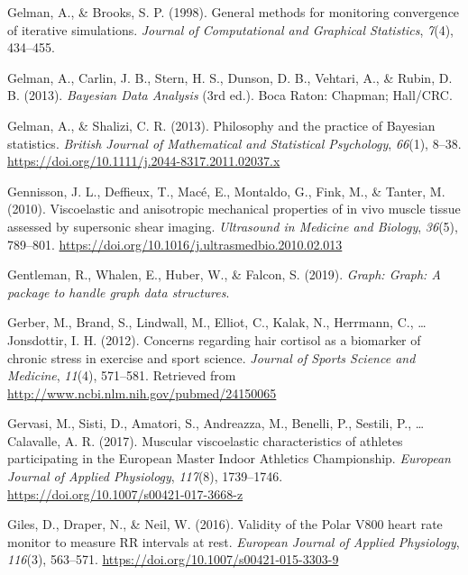 \documentclass[
  english,
  man,floatsintext]{apa6}
\begin{document}
\leavevmode\hypertarget{ref-Gelman1998}{}%
Gelman, A., \& Brooks, S. P. (1998). General methods for monitoring convergence of iterative simulations. \emph{Journal of Computational and Graphical Statistics}, \emph{7}(4), 434--455.

\leavevmode\hypertarget{ref-Gelman2013}{}%
Gelman, A., Carlin, J. B., Stern, H. S., Dunson, D. B., Vehtari, A., \& Rubin, D. B. (2013). \emph{Bayesian Data Analysis} (3rd ed.). Boca Raton: Chapman; Hall/CRC.

\leavevmode\hypertarget{ref-Gelman2013a}{}%
Gelman, A., \& Shalizi, C. R. (2013). Philosophy and the practice of Bayesian statistics. \emph{British Journal of Mathematical and Statistical Psychology}, \emph{66}(1), 8--38. \url{https://doi.org/10.1111/j.2044-8317.2011.02037.x}

\leavevmode\hypertarget{ref-Gennisson2010}{}%
Gennisson, J. L., Deffieux, T., Macé, E., Montaldo, G., Fink, M., \& Tanter, M. (2010). Viscoelastic and anisotropic mechanical properties of in vivo muscle tissue assessed by supersonic shear imaging. \emph{Ultrasound in Medicine and Biology}, \emph{36}(5), 789--801. \url{https://doi.org/10.1016/j.ultrasmedbio.2010.02.013}

\leavevmode\hypertarget{ref-R-graph}{}%
Gentleman, R., Whalen, E., Huber, W., \& Falcon, S. (2019). \emph{Graph: Graph: A package to handle graph data structures}.

\leavevmode\hypertarget{ref-Gerber2012}{}%
Gerber, M., Brand, S., Lindwall, M., Elliot, C., Kalak, N., Herrmann, C., \ldots{} Jonsdottir, I. H. (2012). Concerns regarding hair cortisol as a biomarker of chronic stress in exercise and sport science. \emph{Journal of Sports Science and Medicine}, \emph{11}(4), 571--581. Retrieved from \url{http://www.ncbi.nlm.nih.gov/pubmed/24150065}

\leavevmode\hypertarget{ref-Gervasi2017}{}%
Gervasi, M., Sisti, D., Amatori, S., Andreazza, M., Benelli, P., Sestili, P., \ldots{} Calavalle, A. R. (2017). Muscular viscoelastic characteristics of athletes participating in the European Master Indoor Athletics Championship. \emph{European Journal of Applied Physiology}, \emph{117}(8), 1739--1746. \url{https://doi.org/10.1007/s00421-017-3668-z}

\leavevmode\hypertarget{ref-Giles2016}{}%
Giles, D., Draper, N., \& Neil, W. (2016). Validity of the Polar V800 heart rate monitor to measure RR intervals at rest. \emph{European Journal of Applied Physiology}, \emph{116}(3), 563--571. \url{https://doi.org/10.1007/s00421-015-3303-9}
\end{document}
